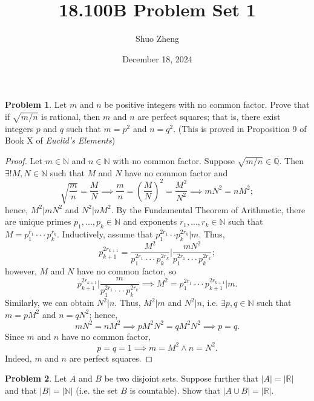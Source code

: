 \documentclass{amsart}
\title{18.100B Problem Set 1}
\author{Shuo Zheng}
\date{December 18, 2024}
\theoremstyle{definition}
\newtheorem{problem}{Problem}
\begin{document}
\maketitle

\begin{problem}
    Let $m$ and $n$ be positive integers with no common factor. Prove that if $\sqrt{m/n}$ is rational, then $m$ and $n$ are perfect squares; that is, there exist integers $p$ and $q$ such that $m = p^2$ and $n = q^2$. (This is proved in Proposition 9 of Book X of \textit{Euclid's Elements})
\end{problem}

\begin{proof}
    Let $m \in \mathbb{N}$ and $n \in \mathbb{N}$ with no common factor. Suppose $\sqrt{m/n} \in \mathbb{Q}$. Then $\exists ! M,N \in \mathbb{N}$ such that $M$ and $N$ have no common factor and 
    \[     
    \sqrt{\frac{m}{n}} = \frac{M}{N} \implies \frac{m}{n} = \left(\frac{M}{N}\right)^2 = \frac{M^2}{N^2} \implies mN^2 = nM^2;     
    \] 
    hence, $M^2 \vert mN^2$ and $N^2 \vert nM^2$. By the Fundamental Theorem of Arithmetic, there are unique primes $p_1,...,p_k \in \mathbb{N}$ and exponents $r_1,...,r_k \in \mathbb{N}$ such that $M = p_1^{r_1} \cdot \cdot \cdot p_k^{r_k}$. Inductively, assume that $p_1^{2r_1} \cdot \cdot p_{k}^{2r_k} \vert m$. Thus,
    \[
    p_{k+1}^{2r_{k+1}} = \frac{M^2}{p_1^{2r_1} \cdot \cdot \cdot p_{k}^{2r_k}} \bigg \vert \frac{mN^2}{p_1^{2r_1} \cdot \cdot \cdot p_{k}^{2r_k}};
    \]
    however, $M$ and $N$ have no common factor, so
    \[
    p_{k+1}^{2r_{k+1}} \bigg \vert \frac{m}{p_1^{2r_1} \cdot \cdot \cdot p_{k}^{2r_k}} \implies M^2 = p_1^{2r_1} \cdot \cdot \cdot p_{k+1}^{2r_{k+1}} \vert m.    
    \]
    Similarly, we can obtain $N^2 \vert n$. Thus, $M^2 \vert m$ and $N^2 \vert n$, i.e. $\exists p,q \in \mathbb{N}$ such that $m = pM^2$ and $n = qN^2$; hence,
    \[
    mN^2 = nM^2 \implies pM^2N^2 = qM^2N^2 \implies p = q.
    \]
    Since $m$ and $n$ have no common factor, 
    \[
    p = q = 1 \implies m = M^2 \land n = N^2.
    \]
    Indeed, $m$ and $n$ are perfect squares.
\end{proof}

\begin{problem}
    Let $A$ and $B$ be two disjoint sets. Suppose further that $\vert A \vert = \vert \mathbb{R} \vert$ and that $\vert B \vert = \vert \mathbb{N} \vert$ (i.e. the set $B$ is countable). Show that $\vert A \cup B \vert = \vert \mathbb{R} \vert$.
\end{problem}
\end{document}
